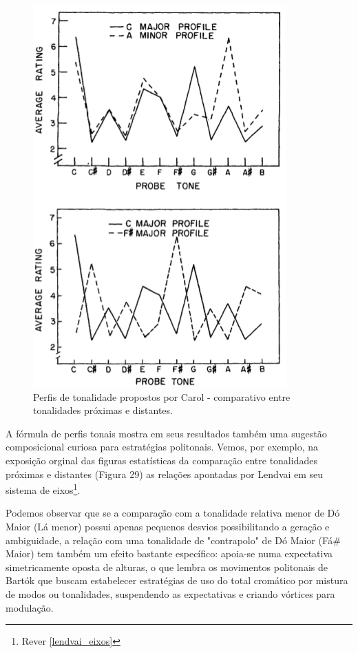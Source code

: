 \documentclass[
	12pt,				%
	openright,			%
	twoside,			%
	a4paper,			%
	english,			%
	french,				%
	spanish,			%
	brazil				%
	]{abntex2}
\begin{document}
\begin{figure}[!h]
	\caption{\label{fig_grafico}Perfis de tonalidade propostos por Carol  - comparativo entre tonalidades próximas e distantes. }
	\begin{center}
	    \includegraphics[scale=0.45]{CBMS/probeones_krumhansl_p36.png}
	\end{center}
\end{figure}


A fórmula de perfis tonais mostra em seus resultados também uma sugestão composicional curiosa para estratégias politonais. Vemos, por exemplo, na exposição orginal das figuras estatísticas da comparação entre tonalidades próximas e distantes (Figura 29) as relações apontadas por Lendvai em seu sistema de eixos\footnote{ Rever \autoref{lendvai_eixos} }. 

Podemos observar que se a comparação com a tonalidade relativa menor de Dó Maior (Lá menor) possui apenas pequenos desvios possibilitando a geração e ambiguidade, a relação com uma tonalidade de "contrapolo" de Dó Maior (Fá\# Maior) tem também um efeito bastante específico: apoia-se numa expectativa simetricamente oposta de alturas, o que lembra os movimentos politonais de Bartók que buscam estabelecer estratégias de uso do total cromático por mistura de modos ou tonalidades, suspendendo as expectativas e criando vórtices para modulação.
\end{document}
